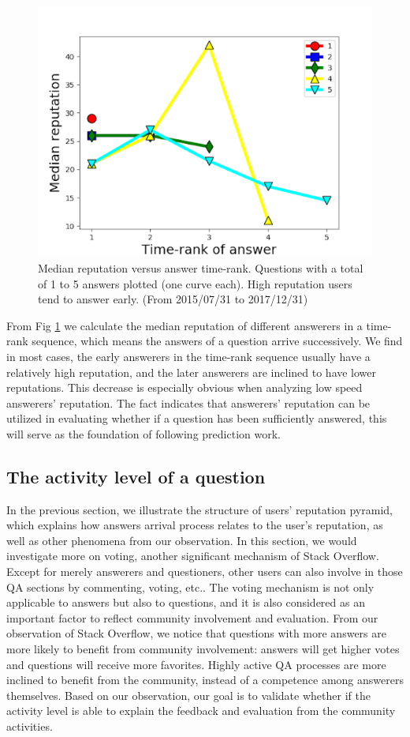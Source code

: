 \begin{figure}[!t]
    \centering
    \includegraphics[width=0.7\columnwidth]{img/Fig1_2017.pdf}
    \caption{Median reputation versus answer time-rank. Questions with a total of 1 to 5 answers plotted (one curve each). High reputation users tend to answer early. (From 2015/07/31 to 2017/12/31)}
    \label{fig:fig1_2010}
\end{figure}

From Fig \ref{fig:fig1_2010} we calculate the median reputation of different answerers in a time-rank sequence, which means the answers of a question arrive successively. We find in most cases, the early answerers in the time-rank sequence usually have a relatively high reputation, and the later answerers are inclined to have lower reputations. This decrease is especially obvious when analyzing low speed answerers' reputation. The fact indicates that answerers' reputation can be utilized in evaluating whether if a question has been sufficiently answered, this will serve as the foundation of following prediction work.


\subsection{The activity level of a question}
In the previous section, we illustrate the structure of users' reputation pyramid, which explains how answers arrival process relates to the user's reputation, as well as other phenomena from our observation. In this section, we would investigate more on voting, another significant mechanism of Stack Overflow. Except for merely answerers and questioners, other users can also involve in those QA sections by commenting, voting, etc.. The voting mechanism is not only applicable to answers but also to questions, and it is also considered as an important factor to reflect community involvement and evaluation. From our observation of Stack Overflow, we notice that questions with more answers are more likely to benefit from community involvement: answers will get higher votes and questions will receive more favorites. Highly active QA processes are more inclined to benefit from the community, instead of a competence among answerers themselves.  Based on our observation, our goal is to validate whether if the activity level is able to explain the feedback and evaluation from the community activities.

